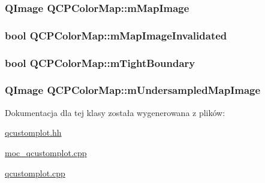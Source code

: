 \subsubsection[{\texorpdfstring{m\+Map\+Image}{mMapImage}}]{\setlength{\rightskip}{0pt plus 5cm}Q\+Image Q\+C\+P\+Color\+Map\+::m\+Map\+Image\hspace{0.3cm}{\ttfamily [protected]}}\hypertarget{class_q_c_p_color_map_a66110813b42eca78b64095b2a1f285a0}{}\label{class_q_c_p_color_map_a66110813b42eca78b64095b2a1f285a0}
\subsubsection[{\texorpdfstring{m\+Map\+Image\+Invalidated}{mMapImageInvalidated}}]{\setlength{\rightskip}{0pt plus 5cm}bool Q\+C\+P\+Color\+Map\+::m\+Map\+Image\+Invalidated\hspace{0.3cm}{\ttfamily [protected]}}\hypertarget{class_q_c_p_color_map_ac9aea6a5c193d7fa866bc7b26e79ef2c}{}\label{class_q_c_p_color_map_ac9aea6a5c193d7fa866bc7b26e79ef2c}
\subsubsection[{\texorpdfstring{m\+Tight\+Boundary}{mTightBoundary}}]{\setlength{\rightskip}{0pt plus 5cm}bool Q\+C\+P\+Color\+Map\+::m\+Tight\+Boundary\hspace{0.3cm}{\ttfamily [protected]}}\hypertarget{class_q_c_p_color_map_ac2e9425fe4381b496726e1c09f978302}{}\label{class_q_c_p_color_map_ac2e9425fe4381b496726e1c09f978302}
\subsubsection[{\texorpdfstring{m\+Undersampled\+Map\+Image}{mUndersampledMapImage}}]{\setlength{\rightskip}{0pt plus 5cm}Q\+Image Q\+C\+P\+Color\+Map\+::m\+Undersampled\+Map\+Image\hspace{0.3cm}{\ttfamily [protected]}}\hypertarget{class_q_c_p_color_map_acad3d52f3572436d5f2e4057911ea8d3}{}\label{class_q_c_p_color_map_acad3d52f3572436d5f2e4057911ea8d3}


Dokumentacja dla tej klasy została wygenerowana z plików\+:\begin{DoxyCompactItemize}
\item 
\hyperlink{qcustomplot_8hh}{qcustomplot.\+hh}\item 
\hyperlink{moc__qcustomplot_8cpp}{moc\+\_\+qcustomplot.\+cpp}\item 
\hyperlink{qcustomplot_8cpp}{qcustomplot.\+cpp}\end{DoxyCompactItemize}

